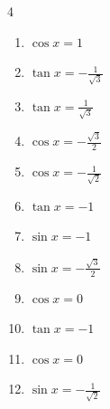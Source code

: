\begin{multicols}{4}
\begin{enumerate}
  \item $\displaystyle \cos{x}  = 1$


  \item $\displaystyle \tan{x}  = -\frac{1}{\sqrt{3}}$


\columnbreak %

  \item $\displaystyle \tan{x}  = \frac{1}{\sqrt{3}}$


  \item $\displaystyle \cos{x}  = -\frac{\sqrt{3}}{2}$


  \item $\displaystyle \cos{x}  = -\frac{1}{\sqrt{2}}$


  \item $\displaystyle \tan{x}  = -1$


  \item $\displaystyle \sin{x}  = -1$


  \item $\displaystyle \sin{x}  = -\frac{\sqrt{3}}{2}$


  \item $\displaystyle \cos{x}  = 0$


  \item $\displaystyle \tan{x}  = -1$


  \item $\displaystyle \cos{x}  = 0$


  \item $\displaystyle \sin{x}  = -\frac{1}{\sqrt{2}}$


\end{enumerate}
\end{multicols}
